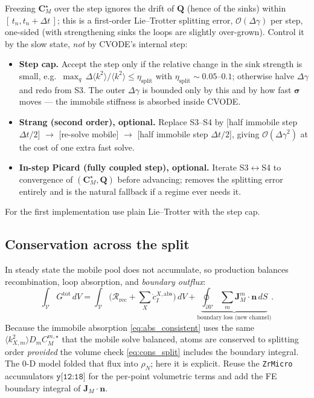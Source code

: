 \documentclass[11pt]{article}
\newcommand{\CM}{\mathbf{C}_{M}}
\newcommand{\sig}{\bm{\sigma}}
\newcommand{\dt}{\Delta t}
\newcommand{\dg}{\Delta \gamma}
\newcommand{\V}{\mathcal{V}}
\newcommand{\dV}{\,dV}
\newcommand{\dS}{\,dS}
\newcommand{\ZrMicro}{\texttt{ZrMicro}}
\begin{document}
Freezing $\CM^\star$ over the step ignores the drift of $\mathbf Q$ (hence of the
sinks) within $[\,t_n,t_n+\dt\,]$; this is a first-order Lie--Trotter splitting
error, $\mathcal O(\dg)$ per step, one-sided (with strengthening sinks the loops
are slightly over-grown). Control it by the slow state, \emph{not} by CVODE's
internal step:
\begin{itemize}[leftmargin=1.4em,topsep=2pt,itemsep=1pt]
\item \textbf{Step cap.} Accept the step only if the relative change in the sink
strength is small, e.g.\ $\max_q\,\Delta\langle k^2\rangle/\langle k^2\rangle\le\eta_{\mathrm{split}}$
with $\eta_{\mathrm{split}}\sim0.05$--$0.1$; otherwise halve $\dg$ and redo from S3.
The outer $\dg$ is bounded only by this and by how fast $\sig$ moves --- the
immobile stiffness is absorbed inside CVODE.
\item \textbf{Strang (second order), optional.} Replace S3--S4 by
[half immobile step $\dt/2$] $\to$ [re-solve mobile] $\to$ [half immobile step
$\dt/2$], giving $\mathcal O(\dg^2)$ at the cost of one extra fast solve.
\item \textbf{In-step Picard (fully coupled step), optional.} Iterate S3$\leftrightarrow$S4
to convergence of $(\CM^\star,\mathbf Q)$ before advancing; removes the splitting
error entirely and is the natural fallback if a regime ever needs it.
\end{itemize}
For the first implementation use plain Lie--Trotter with the step cap.

\subsection{Conservation across the split}
\label{sec:opsplit_cons}

In steady state the mobile pool does not accumulate, so production balances
recombination, loop absorption, and \emph{boundary outflux}:
\begin{equation}
\label{eq:cons_split}
    \int_{\V} G^{\mathrm{tot}}\dV
    =
    \int_{\V}\!\Big(\mathcal R_{\mathrm{rec}} + \sum_X \dot c^{X,\mathrm{abs}}_I\Big)\dV
    + \underbrace{\oint_{\partial\V}\sum_m \mathbf J_M^m\cdot\mathbf n\dS}_{\text{boundary loss (new channel)}}.
\end{equation}
Because the immobile absorption \eqref{eq:abs_consistent} uses the same
$\langle k^2_{X,m}\rangle D_m C_M^{m,\star}$ that the mobile solve balanced, atoms
are conserved to splitting order \emph{provided} the volume check
\eqref{eq:cons_split} includes the boundary integral. The 0-D model folded that
flux into $\rho_N$; here it is explicit. Reuse the \ZrMicro{} accumulators
$\texttt{y[12:18]}$ for the per-point volumetric terms and add the FE boundary
integral of $\mathbf J_M\cdot\mathbf n$.
\end{document}
